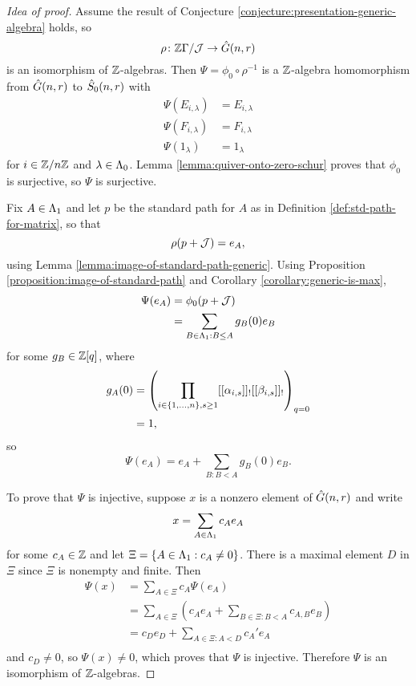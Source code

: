 \documentclass[a4paper, 11pt, twoside]{report}
\begin{document}
\begin{proof}[Idea of proof]
Assume the result of Conjecture \ref{conjecture:presentation-generic-algebra} holds, so
\begin{equation*}
\rho\colon\mathbb{Z}\Gamma/{\mathcal{J}}\to\hat{G}(n,r)
\end{equation*}
is an isomorphism of $\mathbb{Z}$-algebras. Then $\Psi=\phi_0\circ\rho^{-1}$ is a $\mathbb{Z}$-algebra homomorphism from $\hat{G}(n,r)$ to $\hat{S}_0(n,r)$ with
\begin{align*}
\Psi(E_{i,\lambda}) &= E_{i,\lambda}\\
\Psi(F_{i,\lambda}) &= F_{i,\lambda}\\
\Psi(1_\lambda) &= 1_\lambda
\end{align*}
for $i\in\mathbb{Z}/{n \mathbb{Z}}$ and $\lambda\in\Lambda_0{}$. Lemma \ref{lemma:quiver-onto-zero-schur} proves that $\phi_0$ is surjective, so $\Psi$ is surjective.

Fix $A\in\Lambda_1{}$ and let $p$ be the standard path for $A$ as in Definition \ref{def:std-path-for-matrix}, so that
\begin{equation*}
\rho(p+\mathcal{J})=e_A,
\end{equation*}
using Lemma \ref{lemma:image-of-standard-path-generic}. Using Proposition \ref{proposition:image-of-standard-path} and Corollary \ref{corollary:generic-is-max},
\begin{align*}
\Psi(e_A)
&= \phi_0(p+\mathcal{J})\\
&= \sum_{B\in\Lambda_1{}:B\le A} g_B(0) e_B
\end{align*}
for some $g_B\in\mathbb{Z}[q]$, where
\begin{align*}
g_A(0)
&= \left(\prod_{i\in\{1,\ldots,n\},s\geq 1} [[\alpha_{i,s}]]_![[\beta_{i,s}]]_!\right)_{q=0}\\
&= 1,
\end{align*}
so
\begin{equation*}
\Psi(e_A) = e_A +\sum_{B:B<A} g_B(0)e_B.
\end{equation*}

To prove that $\Psi$ is injective, suppose $x$ is a nonzero element of $\hat{G}(n,r)$ and write
\begin{equation*}
x = \sum_{A\in\Lambda_1{}} c_Ae_A
\end{equation*}
for some $c_A\in\mathbb{Z}$ and let $\Xi=\{A\in\Lambda_1{}:c_A\neq 0\}$. There is a maximal element $D$ in $\Xi$ since $\Xi$ is nonempty and finite. Then
\begin{align*}
\Psi(x)
&= \sum_{A\in\Xi} c_A\Psi(e_A)\\
&= \sum_{A\in\Xi} \left(c_Ae_A + \sum_{B\in\Xi:B<A} c_{A,B}e_B\right)\\
&= c_De_D + \sum_{A\in\Xi:A<D} c_A' e_A\\
\end{align*}
and $c_D\neq 0$, so $\Psi(x)\neq 0$, which proves that $\Psi$ is injective. Therefore $\Psi$ is an isomorphism of $\mathbb{Z}$-algebras.
\end{proof}
\end{document}
